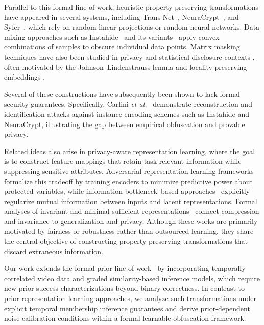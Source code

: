 \documentclass[sigconf,anonymous, review]{acmart}
\begin{document}
Parallel to this formal line of work, heuristic property-preserving transformations have appeared in several systems, including Trans Net~\cite{he2020transnet}, NeuraCrypt~\cite{yala2021neuracrypt}, and Syfer~\cite{yala2022syfer}, which rely on random linear projections or random neural networks. Data mixing approaches such as Instahide~\cite{huang2020instahide} and its variants~\cite{borgnia2021dpinstahide,liu2020datamix} apply convex combinations of samples to obscure individual data points. Matrix masking techniques have also been studied in privacy and statistical disclosure contexts \cite{ding2020triple,zhao2018sparse}, often motivated by the Johnson--Lindenstrauss lemma \cite{larsen2017optimality} and locality-preserving embeddings \cite{indyk1997locality}.

Several of these constructions have subsequently been shown to lack formal security guarantees. Specifically, Carlini \textit{et al.}~\cite{carlini2021privatelearning,carlini2021neuracrypt} demonstrate reconstruction and identification attacks against instance encoding schemes such as Instahide and NeuraCrypt, illustrating the gap between empirical obfuscation and provable privacy.

Related ideas also arise in privacy-aware representation learning, where the goal is to construct feature mappings that retain task-relevant information while suppressing sensitive attributes. Adversarial representation learning frameworks~\cite{edwards2015censoring,louppe2017learning} formalize this tradeoff by training encoders to minimize predictive power about protected variables, while information bottleneck--based approaches~\cite{alemi2016deep} explicitly regularize mutual information between inputs and latent representations. Formal analyses of invariant and minimal sufficient representations~\cite{achille2018information} connect compression and invariance to generalization and privacy. Although these works are primarily motivated by fairness or robustness rather than outsourced learning, they share the central objective of constructing property-preserving transformations that discard extraneous information.

Our work extends the formal prior line of work~\cite{xiao2024formal} by incorporating temporally correlated video data and graded similarity-based inference models, which require new prior success characterizations beyond binary correctness. In contrast to prior representation-learning approaches, we analyze such transformations under explicit temporal membership inference guarantees and derive prior-dependent noise calibration conditions within a formal learnable obfuscation framework.
\end{document}
